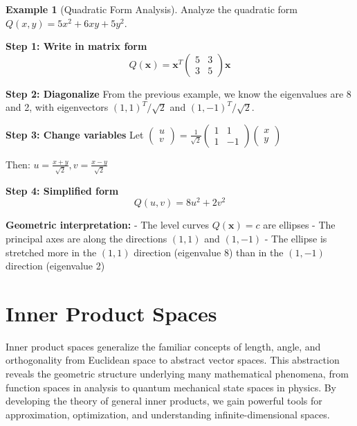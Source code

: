 \documentclass[12pt]{article}
\numberwithin{equation}{section}
\newcommand{\vect}[1]{\boldsymbol{#1}}   %
\theoremstyle{plain}
\theoremstyle{definition}
\newtheorem{example}[theorem]{Example}
\theoremstyle{remark}
\begin{document}
\begin{example}[Quadratic Form Analysis]
Analyze the quadratic form $Q(x,y) = 5x^2 + 6xy + 5y^2$.

\textbf{Step 1: Write in matrix form}
$$Q(\vect{x}) = \vect{x}^T \begin{pmatrix} 5 & 3 \\ 3 & 5 \end{pmatrix} \vect{x}$$

\textbf{Step 2: Diagonalize}
From the previous example, we know the eigenvalues are 8 and 2, with eigenvectors $(1,1)^T/\sqrt{2}$ and $(1,-1)^T/\sqrt{2}$.

\textbf{Step 3: Change variables}
Let $\begin{pmatrix} u \\ v \end{pmatrix} = \frac{1}{\sqrt{2}}\begin{pmatrix} 1 & 1 \\ 1 & -1 \end{pmatrix}\begin{pmatrix} x \\ y \end{pmatrix}$

Then: $u = \frac{x+y}{\sqrt{2}}, v = \frac{x-y}{\sqrt{2}}$

\textbf{Step 4: Simplified form}
$$Q(u,v) = 8u^2 + 2v^2$$

\textbf{Geometric interpretation:}
- The level curves $Q(\vect{x}) = c$ are ellipses
- The principal axes are along the directions $(1,1)$ and $(1,-1)$
- The ellipse is stretched more in the $(1,1)$ direction (eigenvalue 8) than in the $(1,-1)$ direction (eigenvalue 2)
\end{example}

\newpage
\section{Inner Product Spaces}

Inner product spaces generalize the familiar concepts of length, angle, and orthogonality from Euclidean space to abstract vector spaces. This abstraction reveals the geometric structure underlying many mathematical phenomena, from function spaces in analysis to quantum mechanical state spaces in physics. By developing the theory of general inner products, we gain powerful tools for approximation, optimization, and understanding infinite-dimensional spaces.

\end{document}
